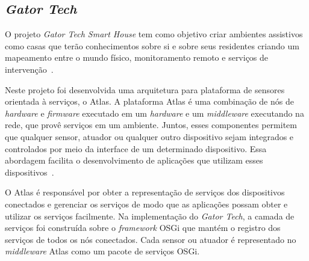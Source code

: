 \subsection{\emph{Gator Tech}}

O projeto \emph{Gator Tech Smart House} tem como objetivo criar ambientes assistivos como casas que terão conhecimentos sobre si e sobre seus residentes criando um mapeamento entre o mundo físico, monitoramento remoto e serviços de intervenção~\cite{gatorTech}.

Neste projeto foi desenvolvida uma arquitetura para plataforma de sensores orientada à serviços, o Atlas. A plataforma Atlas é uma combinação de nós de \emph{hardware} e \emph{firmware} executado em um \emph{hardware} e um \emph{middleware} executando na rede, que provê serviços em um ambiente. Juntos, esses componentes permitem que qualquer sensor, atuador ou qualquer outro dispositivo sejam integrados e controlados por meio da interface de um determinado dispositivo. Essa abordagem facilita o desenvolvimento de aplicações que utilizam esses dispositivos~\cite{gatorTechLessons}. 

O Atlas é responsável por obter a representação de serviços dos dispositivos conectados e gerenciar os serviços de modo que as aplicações possam obter e utilizar os serviços facilmente. Na implementação do \emph{Gator Tech}, a camada de serviços foi construída sobre o \emph{framework} OSGi que mantém o registro dos serviços de todos os nós conectados. Cada sensor ou atuador é representado no \emph{middleware} Atlas como um pacote de serviços OSGi. 